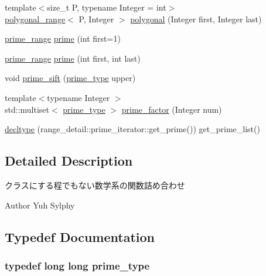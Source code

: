 \begin{DoxyCompactItemize}
\item 
{\footnotesize template$<$size\-\_\-t \-P, typename Integer  = int$>$ }\\\hyperlink{classyuh_1_1polygonal__range}{polygonal\-\_\-range}$<$ \-P, \-Integer $>$ \hyperlink{namespaceyuh_a1af8d0faca38b0efb8ae71d0f773d3c8}{polygonal} (\-Integer first, \-Integer last)
\item 
\hyperlink{classyuh_1_1prime__range}{prime\-\_\-range} \hyperlink{namespaceyuh_ad0e08caa71b8e5172b1535657bbc0648}{prime} (int first=1)
\item 
\hyperlink{classyuh_1_1prime__range}{prime\-\_\-range} \hyperlink{namespaceyuh_a31e810e0c57ef83ca515b12f1aac0bf3}{prime} (int first, int last)
\item 
void \hyperlink{namespaceyuh_ac7fcc7fa46bf6b7cf12a53a653b23317}{prime\-\_\-sift} (\hyperlink{namespaceyuh_af542f8440602da42322ddb7ea8242336}{prime\-\_\-type} upper)
\item 
{\footnotesize template$<$typename Integer $>$ }\\std\-::multiset$<$ \hyperlink{namespaceyuh_af542f8440602da42322ddb7ea8242336}{prime\-\_\-type} $>$ \hyperlink{namespaceyuh_afb5d08e183729831f760d6c2a27226d8}{prime\-\_\-factor} (\-Integer num)
\item 
\hyperlink{namespaceyuh_aef8d22260a5c6af5f37d206badfd3d4e}{decltype} (range\-\_\-detail\-::prime\-\_\-iterator\-::get\-\_\-prime()) get\-\_\-prime\-\_\-list()
\end{DoxyCompactItemize}


\subsection{\-Detailed \-Description}
クラスにする程でもない数学系の関数詰め合わせ \begin{DoxyAuthor}{\-Author}
\-Yuh \-Sylphy 
\end{DoxyAuthor}


\subsection{\-Typedef \-Documentation}
\hypertarget{namespaceyuh_af542f8440602da42322ddb7ea8242336}{
\subsubsection[{prime\-\_\-type}]{\setlength{\rightskip}{0pt plus 5cm}typedef long long {\bf prime\-\_\-type}}}\label{d5/d2b/namespaceyuh_af542f8440602da42322ddb7ea8242336}


